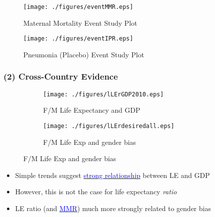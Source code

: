 \documentclass[10pt,letterpaper,subeqn]{beamer}
\begin{document}
\begin{frame}
\begin{figure}
\caption{Maternal Mortality Event Study Plot}
\texttt{[image: ./figures/eventMMR.eps]}
\end{figure}
\end{frame}

\begin{frame}
\begin{figure}
\caption{Pneumonia (Placebo) Event Study Plot}
\texttt{[image: ./figures/eventIPR.eps]}
\end{figure}
\end{frame}

\begin{frame}[label=CC1]
\frametitle{(2) Cross-Country Evidence}
\begin{figure}[htpb!]
\centering
\begin{subfigure}{.5\textwidth}
  \centering
  \texttt{[image: ./figures/lLErGDP2010.eps]}
  \caption{F/M Life Expectancy and GDP}
  \label{TWINfig:fertrend}
\end{subfigure}%
\begin{subfigure}{.5\textwidth}
  \centering
  \texttt{[image: ./figures/lLErdesiredall.eps]}
  \caption{F/M Life Exp and gender bias}
  \label{TWINfig:eductrend}
\end{subfigure}
\end{figure}
\begin{itemize}
\item Simple trends suggest \hyperlink{trends}{\textcolor{blue}{strong 
      relationship}} between LE and GDP
\item However, this is not the case for life expectancy \emph{ratio}
\item LE ratio (and \hyperlink{MMRBias}{\textcolor{blue}{MMR}}) much more 
      strongly related to gender bias
\end{itemize}
\end{frame}
\end{document}
